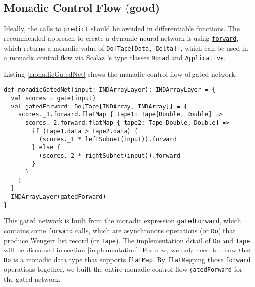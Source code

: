 \subsection{Monadic Control Flow (good)\label{monadic}}

Ideally, the calls to \lstinline{predict} should be avoided in differentiable functions. The recommended approach to create a dynamic neural network is using \href{https://javadoc.io/page/com.thoughtworks.deeplearning/deeplearning_2.11/latest/com/thoughtworks/deeplearning/DeepLearning.html#forward(differentiable:Differentiable):com.thoughtworks.raii.asynchronous.Do[com.thoughtworks.deeplearning.DeepLearning.Tape[DeepLearning.this.Data,DeepLearning.this.Delta]]}{\lstinline{forward}}, which returns a monadic value of \lstinline{Do[Tape[Data, Delta]]}, which can be used in a monadic control flow via Scalaz \cite{kenji2017scalaz}'s type classes \cite{oliveira2010type} \lstinline{Monad} and \lstinline{Applicative}.

Listing \ref{monadicGatedNet} shows the monadic control flow of gated network.

\begin{lstlisting}[float={htbp},caption={Monadic gated network}, label={monadicGatedNet}]
def monadicGatedNet(input: INDArrayLayer): INDArrayLayer = {
  val scores = gate(input)
  val gatedForward: Do[Tape[INDArray, INDArray]] = {
    scores._1.forward.flatMap { tape1: Tape[Double, Double] =>
      scores._2.forward.flatMap { tape2: Tape[Double, Double] =>
        if (tape1.data > tape2.data) {
          (scores._1 * leftSubnet(input)).forward
        } else {
          (scores._2 * rightSubnet(input)).forward
        }
      }
    }
  }
  INDArrayLayer(gatedForward)
}
\end{lstlisting}

This gated network is built from the monadic expression \lstinline{gatedForward}, which contains some \lstinline{forward} calls, which are asynchronous operations (or \href{https://javadoc.io/page/com.thoughtworks.raii/asynchronous_2.11/latest/com/thoughtworks/raii/asynchronous%24%24Do.html}{\lstinline{Do}}) that produce Wengert list record (or \href{https://javadoc.io/page/com.thoughtworks.deeplearning/deeplearning_2.11/latest/com/thoughtworks/deeplearning/DeepLearning%24%24Tape.html}{\lstinline{Tape}}). The implementation detail of \lstinline{Do} and \lstinline{Tape} will be discussed in section \ref{implementation}. For now, we only need to know that \lstinline{Do} is a monadic data type that supports \lstinline{flatMap}. By \lstinline{flatMap}ping those \lstinline{forward} operations together, we built the entire monadic control flow \lstinline{gatedForward} for the gated network.

